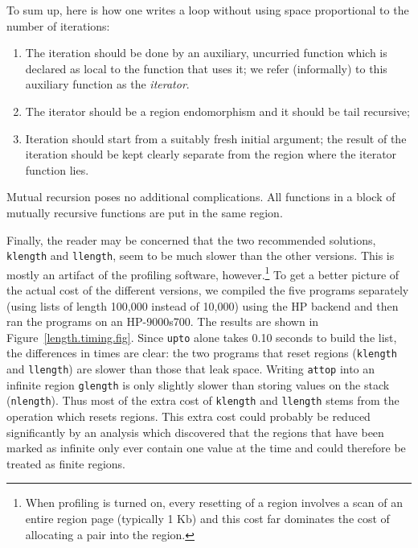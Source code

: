 \documentclass[12pt]{book}
\begin{document}
To sum up, here is how one writes a loop without using space proportional
to the number of iterations:
\begin{enumerate}
\item The iteration should be done by an auxiliary, uncurried function 
      which is declared as local to the function that uses it; we
      refer (informally) 
      to this auxiliary function as the {\em iterator}.
\item The iterator should be a region endomorphism and it should 
      be tail recursive;
\item Iteration should start from a suitably fresh initial argument;
      the result of the iteration should be kept clearly separate
      from the region where the iterator function lies.
\end{enumerate}
Mutual recursion poses no additional complications. All functions
in a block of mutually recursive functions are put in the same region.

Finally, the reader may be concerned that the two recommended
solutions, {\tt klength} and {\tt llength}, seem to be much slower
than the other versions. This is mostly an artifact of the profiling
software, however.\footnote{When profiling is turned on, 
every resetting of a region involves a scan of an entire
region page (typically 1 Kb) and this cost far dominates
the cost of allocating a pair into the region.} To get
a better picture of the actual cost of the different versions, we
compiled the five programs separately (using lists of length 100,000
instead of 10,000) using the HP backend and then 
ran the programs on an HP-9000s700. The results are shown 
in Figure~\ref{length.timing.fig}. Since {\tt upto} alone
takes 0.10 seconds to build the list, the differences 
in times are clear:
the two
programs that reset regions ({\tt klength} and {\tt llength}) are
slower than those that leak space. Writing {\tt attop} into
an infinite region {\tt glength} is only slightly slower than
storing values on the stack ({\tt nlength}). Thus most of the extra
cost of {\tt klength} and {\tt llength} stems from the operation
which resets regions. This extra cost could probably be reduced
significantly by an analysis which discovered that the regions
that have been marked as infinite only ever contain one value
at the time and could therefore be treated as finite regions.
\end{document}
